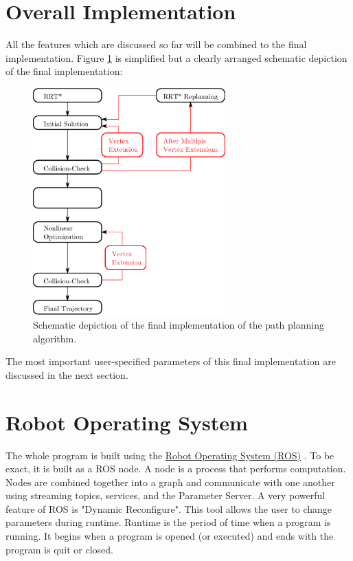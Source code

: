 \section{Overall Implementation}

All the features which are discussed so far will be combined to the final implementation.  Figure \ref{pic:overall} is simplified but a clearly arranged schematic depiction of the final implementation:
%

\begin{figure}[H]
   \centering
   \includegraphics[width=0.66\textwidth]{pics/overall2.eps}
   \caption{Schematic depiction of the final implementation of the path planning algorithm.}
   \label{pic:overall}
\end{figure}

The most important user-specified parameters of this final implementation are discussed in the next section.






\section{Robot Operating System}

The whole program is built using the \href{http://www.ros.org/}{Robot Operating System (ROS)} \cite{ROS}. To be exact, it is built as a ROS node. A node is a process that performs computation. Nodes are combined together into a graph and communicate with one another using streaming topics, services, and the Parameter Server. A very powerful feature of ROS is "Dynamic Reconfigure". This tool allows the user to change parameters during runtime. Runtime is the period of time when a program is running. It begins when a program is opened (or executed) and ends with the program is quit or closed.

